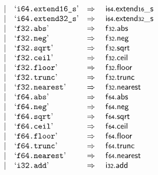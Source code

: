 $$\begin{array}[t]{@{}lrrl@{}l@{}l@{}l@{}}
& & | & \mbox{‘\texttt{i64.extend16\_s}’} & \quad\Rightarrow\quad{} & \mathsf{i{\scriptstyle 64}} {.} {\mathsf{extend}}{\mathsf{{\scriptstyle 16}}}{\mathsf{\_}}{\mathsf{s}} \\
& & | & \mbox{‘\texttt{i64.extend32\_s}’} & \quad\Rightarrow\quad{} & \mathsf{i{\scriptstyle 64}} {.} {\mathsf{extend}}{\mathsf{{\scriptstyle 32}}}{\mathsf{\_}}{\mathsf{s}} \\
& & | & \mbox{‘\texttt{f32.abs}’} & \quad\Rightarrow\quad{} & \mathsf{f{\scriptstyle 32}} {.} \mathsf{abs} \\
& & | & \mbox{‘\texttt{f32.neg}’} & \quad\Rightarrow\quad{} & \mathsf{f{\scriptstyle 32}} {.} \mathsf{neg} \\
& & | & \mbox{‘\texttt{f32.sqrt}’} & \quad\Rightarrow\quad{} & \mathsf{f{\scriptstyle 32}} {.} \mathsf{sqrt} \\
& & | & \mbox{‘\texttt{f32.ceil}’} & \quad\Rightarrow\quad{} & \mathsf{f{\scriptstyle 32}} {.} \mathsf{ceil} \\
& & | & \mbox{‘\texttt{f32.floor}’} & \quad\Rightarrow\quad{} & \mathsf{f{\scriptstyle 32}} {.} \mathsf{floor} \\
& & | & \mbox{‘\texttt{f32.trunc}’} & \quad\Rightarrow\quad{} & \mathsf{f{\scriptstyle 32}} {.} \mathsf{trunc} \\
& & | & \mbox{‘\texttt{f32.nearest}’} & \quad\Rightarrow\quad{} & \mathsf{f{\scriptstyle 32}} {.} \mathsf{nearest} \\
& & | & \mbox{‘\texttt{f64.abs}’} & \quad\Rightarrow\quad{} & \mathsf{f{\scriptstyle 64}} {.} \mathsf{abs} \\
& & | & \mbox{‘\texttt{f64.neg}’} & \quad\Rightarrow\quad{} & \mathsf{f{\scriptstyle 64}} {.} \mathsf{neg} \\
& & | & \mbox{‘\texttt{f64.sqrt}’} & \quad\Rightarrow\quad{} & \mathsf{f{\scriptstyle 64}} {.} \mathsf{sqrt} \\
& & | & \mbox{‘\texttt{f64.ceil}’} & \quad\Rightarrow\quad{} & \mathsf{f{\scriptstyle 64}} {.} \mathsf{ceil} \\
& & | & \mbox{‘\texttt{f64.floor}’} & \quad\Rightarrow\quad{} & \mathsf{f{\scriptstyle 64}} {.} \mathsf{floor} \\
& & | & \mbox{‘\texttt{f64.trunc}’} & \quad\Rightarrow\quad{} & \mathsf{f{\scriptstyle 64}} {.} \mathsf{trunc} \\
& & | & \mbox{‘\texttt{f64.nearest}’} & \quad\Rightarrow\quad{} & \mathsf{f{\scriptstyle 64}} {.} \mathsf{nearest} \\
& & | & \mbox{‘\texttt{i32.add}’} & \quad\Rightarrow\quad{} & \mathsf{i{\scriptstyle 32}} {.} \mathsf{add} \\

\end{array}$$
